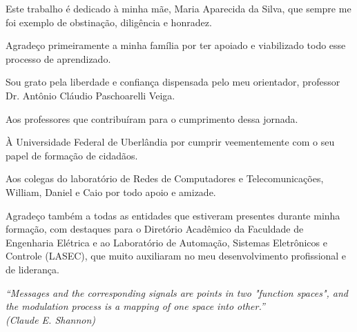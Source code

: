 \documentclass[
  12pt,				%
  openright,			%
  twoside,			%
  a4paper,			%
  english,			%
  french,				%
  spanish,			%
  brazil,				%
  ]{abntex2}
\begin{document}

\begin{dedicatoria}
  \vspace*{\fill}
  Este trabalho é dedicado à minha mãe, Maria Aparecida da Silva, que sempre me foi exemplo de obstinação, diligência e honradez.
  \vspace*{\fill}

\end{dedicatoria}


\begin{agradecimentos}
  Agradeço primeiramente a minha família por ter apoiado e viabilizado todo esse processo de
  aprendizado.

  Sou grato pela liberdade e confiança dispensada pelo meu orientador, professor Dr. Antônio
  Cláudio Paschoarelli Veiga.

  Aos professores que contribuíram para o cumprimento dessa jornada.

  À Universidade Federal de Uberlândia por cumprir veementemente com o seu papel de formação de
  cidadãos.

  Aos colegas do laboratório de Redes de Computadores e Telecomunicações, William, Daniel e Caio
  por todo apoio e amizade.

  Agradeço também a todas as entidades que estiveram presentes durante minha formação, com destaques
  para o Diretório Acadêmico da Faculdade de Engenharia Elétrica e ao Laboratório de Automação,
  Sistemas Eletrônicos e Controle (LASEC), que muito auxiliaram no meu desenvolvimento profissional
  e de liderança.

\end{agradecimentos}

\begin{epigrafe}
  \vspace*{\fill}
  \begin{flushright}
    \textit{``Messages and the corresponding signals are points in two "function spaces", and the
      modulation process is a mapping of one space into other.''\\ (Claude E. Shannon)}
  \end{flushright}
\end{epigrafe}
\end{document}

